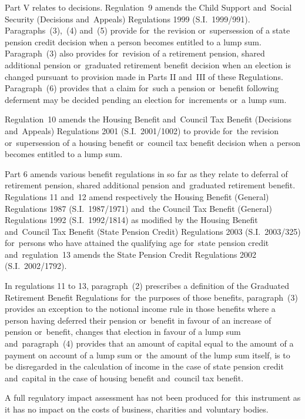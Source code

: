 \documentclass[12pt,a4paper]{article}
\begin{document}
Part V relates to decisions. Regulation~9 amends the Child Support and~Social Security (Decisions and~Appeals) Regulations 1999 (S.I.~1999/991). Paragraphs~(3),~(4) and~(5) provide for~the revision or~supersession of a state pension credit decision when a person becomes entitled to a lump sum. Paragraph~(3) also provides for~revision of a retirement pension, shared additional pension or~graduated retirement benefit decision when an election is changed pursuant to provision made in Parts II and~III of these Regulations. Paragraph~(6) provides that a claim for~such a pension or~benefit following deferment may be decided pending an election for~increments or~a lump sum.

Regulation~10 amends the Housing Benefit and~Council Tax Benefit (Decisions and~Appeals) Regulations 2001 (S.I.~2001/1002) to provide for~the revision or~supersession of a housing benefit or~council tax benefit decision when a person becomes entitled to a lump sum.

Part 6 amends various benefit regulations in so far as they relate to deferral of retirement pension, shared additional pension and~graduated retirement benefit. Regulations 11 and~12 amend respectively the Housing Benefit (General) Regulations 1987 (S.I.~1987/1971) and~the Council Tax Benefit (General) Regulations 1992 (S.I.~1992/1814) as modified by the Housing Benefit and~Council Tax Benefit (State Pension Credit) Regulations 2003 (S.I.~2003/325) for~persons who have attained the qualifying age for~state pension credit and~regulation~13 amends the State Pension Credit Regulations 2002 (S.I.~2002/1792).

In regulations 11 to 13, paragraph~(2) prescribes a definition of the Graduated Retirement Benefit Regulations for~the purposes of those benefits, paragraph~(3) provides an exception to the notional income rule in those benefits where a person having deferred their pension or~benefit in favour of an increase of pension or~benefit, changes that election in favour of a lump sum and~paragraph~(4) provides that an amount of capital equal to the amount of a payment on account of a lump sum or~the amount of the lump sum itself, is to be disregarded in the calculation of income in the case of state pension credit and~capital in the case of housing benefit and~council tax benefit.

A full regulatory impact assessment has not been produced for~this instrument as it has no impact on the costs of business, charities and~voluntary bodies. 
\end{document}
